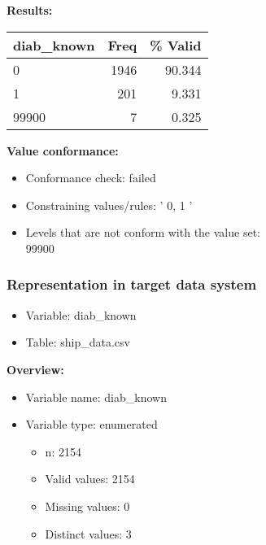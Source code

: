 \documentclass[
]{article}
\providecommand{\tightlist}{%
  \setlength{\itemsep}{0pt}\setlength{\parskip}{0pt}}
\begin{document}
\textbf{Results:}\\

\begin{table}[H]
\centering
\begin{tabular}{l|r|r}
\hline
\textbf{diab\_known} & \textbf{Freq} & \textbf{\% Valid}\\
\hline
0 & 1946 & 90.344\\
\hline
1 & 201 & 9.331\\
\hline
99900 & 7 & 0.325\\
\hline
\end{tabular}
\end{table}

\textbf{Value conformance:}

\begin{itemize}
\tightlist
\item
  Conformance check: failed
\item
  Constraining values/rules: ' 0, 1 '
\item
  Levels that are not conform with the value set:\\
  99900
\end{itemize}

\newpage

\hypertarget{representation-in-target-data-system-9}{%
\subsubsection{\texorpdfstring{Representation in \textbf{target} data
system}{Representation in target data system}}\label{representation-in-target-data-system-9}}

\begin{itemize}
\tightlist
\item
  Variable: diab\_known
\item
  Table: ship\_data.csv
\end{itemize}

\textbf{Overview:}

\begin{itemize}
\tightlist
\item
  Variable name: diab\_known
\item
  Variable type: enumerated

  \begin{itemize}
  \tightlist
  \item
    n: 2154
  \item
    Valid values: 2154
  \item
    Missing values: 0
  \item
    Distinct values: 3
  \end{itemize}
\end{itemize}
\end{document}
